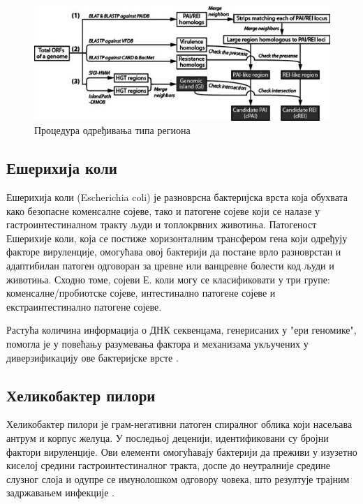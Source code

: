 \documentclass[12pt]{article}
\begin{document}
\begin{figure}[htbp]
    \centering
    \includegraphics[width=0.8\linewidth]{images/pai_grafik.jpg}
    \caption{Процедура одређивања типа региона \cite{Yoon2014-xa}}
\end{figure}

\newpage

\subsection{Ешерихија коли}

Ешерихија коли (Escherichia coli) је разноврсна бактеријска врста која обухвата како безопасне коменсалне сојеве, тако и патогене сојеве који се налазе у гастроинтестиналном тракту људи и топлокрвних животиња. Патогеност Ешерихије коли, која се постиже хоризонталним трансфером гена који одређују факторе вируленције, омогућава овој бактерији да постане врло разноврстан и адаптибилан патоген одговоран за цревне или ванцревне болести код људи и животиња. Сходно томе, сојеви Е. коли могу се класификовати у три групе: коменсалне/пробиотске сојеве, интестинално патогене сојеве и екстраинтестинално патогене сојеве.

Растућа количина информација о ДНК секвенцама, генерисаних у "ери геномике", помогла је у повећању разумевања фактора и механизама укључених у диверзификацију ове бактеријске врсте \cite{Desvaux2020-mx}. 

\subsection{Хеликобактер пилори}

Хеликобактер пилори је грам-негативни патоген спиралног облика који насељава антрум и корпус желуца. У последњој деценији, идентификовани су бројни фактори вируленције. Ови елементи омогућавају бактерији да преживи у изузетно киселој средини гастроинтестиналног тракта, доспе до неутралније средине слузног слоја и одупре се имунолошком одговору човека, што резултује трајним задржавањем инфекције \cite{2022helicobacter}.
\end{document}

